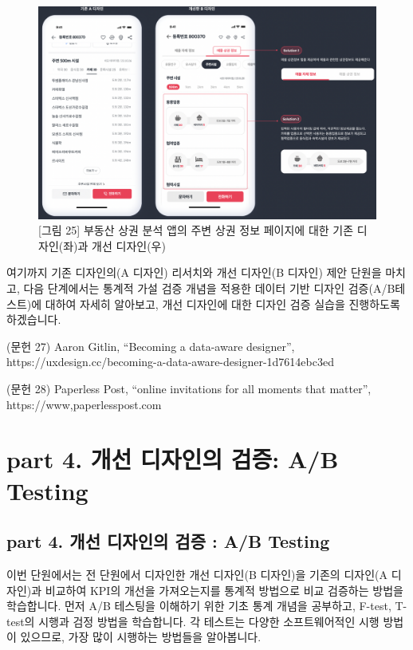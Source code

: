 \documentclass[
  letterpaper,
]{book}
\begin{document}
\begin{figure}[H]

{\centering \includegraphics{img/fig25.png}

}

\caption{{[}그림 25{]} 부동산 상권 분석 앱의 주변 상권 정보 페이지에
대한 기존 디자인(좌)과 개선 디자인(우)}

\end{figure}%

여기까지 기존 디자인의(A 디자인) 리서치와 개선 디자인(B 디자인) 제안
단원을 마치고, 다음 단계에서는 통계적 가설 검증 개념을 적용한 데이터
기반 디자인 검증(A/B테스트)에 대하여 자세히 알아보고, 개선 디자인에 대한
디자인 검증 실습을 진행하도록 하겠습니다.

(문헌 27) Aaron Gitlin, ``Becoming a data-aware designer'',
https://uxdesign.cc/becoming-a-data-aware-designer-1d7614ebc3ed

(문헌 28) Paperless Post, ``online invitations for all moments that
matter'', https://www,paperlesspost.com

\part{\textbf{part 4. 개선 디자인의 검증: A/B Testing}}

\chapter{part 4. 개선 디자인의 검증 : A/B
Testing}\label{part-4.-uxac1cuxc120-uxb514uxc790uxc778uxc758-uxac80uxc99d-ab-testing-1}

이번 단원에서는 전 단원에서 디자인한 개선 디자인(B 디자인)을 기존의
디자인(A 디자인)과 비교하여 KPI의 개선을 가져오는지를 통계적 방법으로
비교 검증하는 방법을 학습합니다. 먼저 A/B 테스팅을 이해하기 위한 기초
통계 개념을 공부하고, F-test, T-test의 시행과 검정 방법을 학습합니다. 각
테스트는 다양한 소프트웨어적인 시행 방법이 있으므로, 가장 많이 시행하는
방법들을 알아봅니다.
\end{document}
